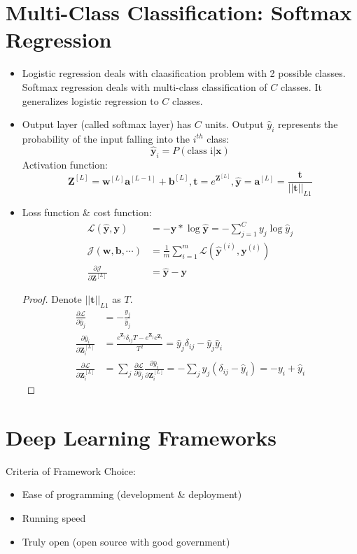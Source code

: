 \section{Multi-Class Classification: Softmax Regression}
\begin{itemize}
  \item Logistic regression deals with claasification problem with 2 possible classes. Softmax regression deals with multi-class classification of $C$ classes. It generalizes logistic regression to $C$ classes.
  \item Output layer (called softmax layer) has $C$ units. Output $\hat{y}_i$ represents the probability of the input falling into the $i^{th}$ class:
  \[\hat{\mathbf{y}}_i=P\left(\text{class i}\vert \mathbf{x}\right)\] Activation function:
    \[\mathbf{Z}^{[L]}=\mathbf{w}^{[L]}\mathbf{a}^{[L-1]}+\mathbf{b}^{[L]},\mathbf{t}=e^{\mathbf{Z}^{[L]}},\hat{\mathbf{y}}=\mathbf{a}^{[L]}=\frac{\mathbf{t}}{\vert\vert\mathbf{t}\vert\vert_{L1}}\]
  \item Loss function \& cost function:
  \begin{align*}
    \mathcal{L}\left(\hat{\mathbf{y}},\mathbf{y}\right)&=-\mathbf{y}*\log{\hat{\mathbf{y}}}=-\displaystyle\sum_{j=1}^{C}y_j\log{\hat{y}_j}\\
    \mathcal{J}\left(\mathbf{w}, \mathbf{b}, \cdots\right)&=\frac{1}{m}\displaystyle\sum_{i=1}^m\mathcal{L}\left(\hat{\mathbf{y}}^{(i)},\mathbf{y}^{(i)}\right)\\
    \frac{\partial \mathcal{J}}{\partial \mathbf{Z}^{[L]}}&=\hat{\mathbf{y}}-\mathbf{y}
  \end{align*}
  \begin{proof}
    Denote $\vert\vert\mathbf{t}\vert\vert_{L1}$ as $T$.
    \begin{align*}
    \frac{\partial \mathcal{L}}{\partial \hat{y}_j}&=-\frac{y_j}{\hat{y}_j}\\
    \frac{\partial \hat{y}_i}{\partial \mathbf{Z}^{[L]}_i}&=\frac{e^{\mathbf{Z}_j}\delta_{ij}T-e^{\mathbf{Z}_j}e^{\mathbf{Z}_i}}{T^2}=\hat{y}_j\delta_{ij}-\hat{y}_j\hat{y}_i\\
    \frac{\partial \mathcal{L}}{\partial \mathbf{Z}^{[L]}_i}&=\displaystyle\sum_{j}\frac{\partial \mathcal{L}}{\partial \hat{y}_j}\frac{\partial \hat{y}_i}{\partial \mathbf{Z}^{[L]}_i}=-\displaystyle\sum_{j}y_j(\delta_{ij}-\hat{y}_i)=-y_i+\hat{y}_i
    \end{align*}
  \end{proof}
\end{itemize}
\section{Deep Learning Frameworks}
Criteria of Framework Choice:
\begin{itemize}
\item Ease of programming (development \& deployment)
\item Running speed
\item Truly open (open source with good government)
\end{itemize}
\ifx\PREAMBLE\undefined

\fi